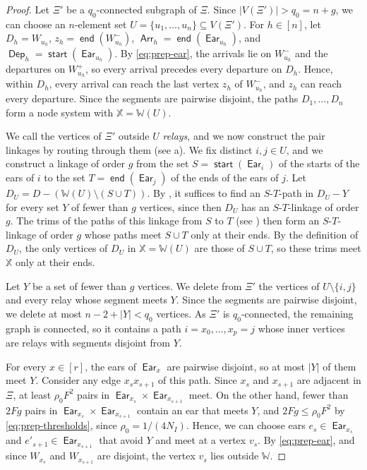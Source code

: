 \documentclass[fontsize=12pt,leading=14pt]{fullpaper}
\DeclareMathOperator{\st}{\mathsf{start}}
\DeclareMathOperator{\en}{\mathsf{end}}
\DeclareMathOperator{\Arr}{\mathsf{Arr}}
\DeclareMathOperator{\Dep}{\mathsf{Dep}}
\DeclareMathOperator{\Ear}{\mathsf{Ear}}
\newcommand{\XX}{\mathbb{X}}
\newcommand{\WW}{\mathbb{W}}
\begin{document}
\begin{proof}
  Let $\Xi'$ be a $q_0$-connected subgraph of $\Xi$.
  Since $|V(\Xi')|>q_0=n+g$, we can choose an $n$-element set $U=\{u_1,\dots,u_n\}\subseteq V(\Xi')$.
  For $h\in[n]$, let $D_h=W_{u_h}$, $z_h=\en(W_{u_h}^-)$, $\Arr_h=\en(\Ear_{u_h})$, and $\Dep_h=\st(\Ear_{u_h})$.
  By \eqref{eq:prep-ear}, the arrivals lie on $W_{u_h}^-$ and the departures on $W_{u_h}^+$, so every arrival precedes every departure on $D_h$.
  Hence, within $D_h$, every arrival can reach the last vertex $z_h$ of $W_{u_h}^-$, and $z_h$ can reach every departure.
  Since the segments are pairwise disjoint, the paths $D_1,\dots,D_n$ form a node system with $\XX=\WW(U)$.

  We call the vertices of $\Xi'$ outside $U$ \emph{relays}, and we now construct the pair linkages by routing through them (see a).
  We fix distinct $i,j\in U$, and we construct a linkage of order $g$ from the set $S=\st(\Ear_i)$ of the starts of the ears of $i$ to the set $T=\en(\Ear_j)$ of the ends of the ears of $j$.
  Let $D_U=D-(\WW(U)\setminus(S\cup T))$.
  By , it suffices to find an $S$-$T$-path in $D_U-Y$ for every set $Y$ of fewer than $g$ vertices, since then $D_U$ has an $S$-$T$-linkage of order $g$.
  The trims of the paths of this linkage from $S$ to $T$ (see ) then form an $S$-$T$-linkage of order $g$ whose paths meet $S\cup T$ only at their ends.
  By the definition of $D_U$, the only vertices of $D_U$ in $\XX=\WW(U)$ are those of $S\cup T$, so these trims meet $\XX$ only at their ends.

  Let $Y$ be a set of fewer than $g$ vertices.
  We delete from $\Xi'$ the vertices of $U\setminus\{i,j\}$ and every relay whose segment meets $Y$.
  Since the segments are pairwise disjoint, we delete at most $n-2+|Y|<q_0$ vertices.
  As $\Xi'$ is $q_0$-connected, the remaining graph is connected, so it contains a path $i=x_0,\dots,x_p=j$ whose inner vertices are relays with segments disjoint from $Y$.

  For every $x\in[r]$, the ears of $\Ear_x$ are pairwise disjoint, so at most $|Y|$ of them meet $Y$.
  Consider any edge $x_sx_{s+1}$ of this path.
  Since $x_s$ and $x_{s+1}$ are adjacent in $\Xi$, at least $\rho_0F^2$ pairs in $\Ear_{x_s}\times\Ear_{x_{s+1}}$ meet.
  On the other hand, fewer than $2Fg$ pairs in $\Ear_{x_s}\times\Ear_{x_{s+1}}$ contain an ear that meets $Y$, and $2Fg\le\rho_0F^2$ by \eqref{eq:prep-thresholds}, since $\rho_0=1/(4N_I)$.
  Hence, we can choose ears $e_s\in\Ear_{x_s}$ and $e'_{s+1}\in\Ear_{x_{s+1}}$ that avoid $Y$ and meet at a vertex $v_s$.
  By \eqref{eq:prep-ear}, and since $W_{x_s}$ and $W_{x_{s+1}}$ are disjoint, the vertex $v_s$ lies outside $\WW$.


\end{proof}
\end{document}
